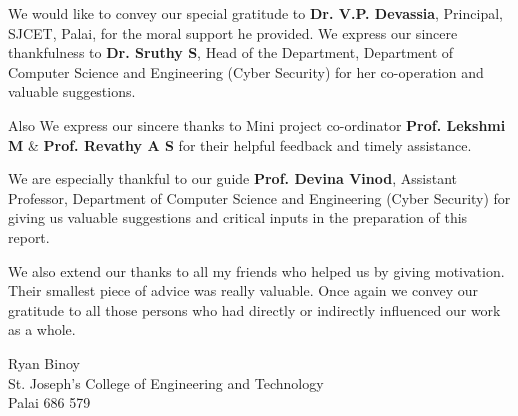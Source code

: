 \documentclass[12pt,a4paper]{report}
\begin{document}
    We would like to convey our special gratitude to \textbf{Dr. V.P. Devassia}, Principal, SJCET, Palai, for the moral support he provided. We express our sincere thankfulness to \textbf{Dr. Sruthy S}, Head of the Department, Department of Computer Science and Engineering (Cyber Security) for her co-operation and valuable suggestions.

    Also We express our sincere thanks to Mini project co-ordinator \textbf{Prof. Lekshmi M} \& \textbf{Prof. Revathy A S} for their helpful feedback and timely assistance.

    We are especially thankful to our guide \textbf{Prof. Devina Vinod}, Assistant Professor, Department of Computer Science and Engineering (Cyber Security) for giving us valuable suggestions and critical inputs in the preparation of this report.

    We also extend our thanks to all my friends who helped us by giving motivation. Their smallest piece of advice was really valuable. Once again we convey our gratitude to all those persons who had directly or indirectly influenced our work as a whole.

    \vspace{2cm}
    \begin{flushright}
        {Ryan Binoy} \\
        {St. Joseph's College of Engineering and Technology} \\
        {Palai 686 579}
    \end{flushright}
    \clearpage
\end{document}

